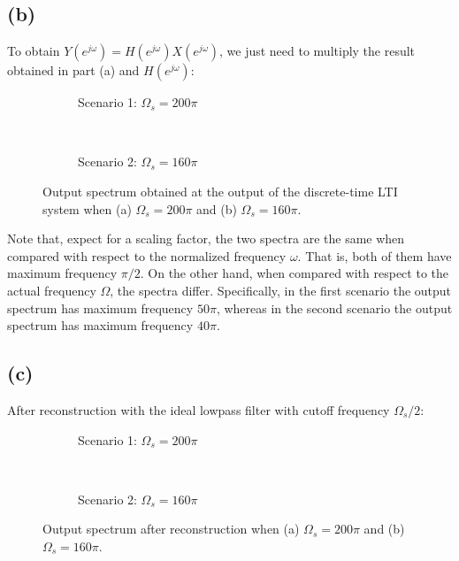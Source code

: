 \documentclass{article}
\begin{document}
\subsection{(b)}
To obtain $Y(e^{j\omega}) = H(e^{j\omega})X(e^{j\omega})$, we just need to multiply the result obtained in part (a) and $H(e^{j\omega})$:

\begin{figure}[h!]
	\centering
	\begin{subfigure}[h!]{0.5\textwidth}
		\resizebox{\textwidth}{!}{}
		\caption{Scenario 1: $\Omega_s = 200\pi$}
	\end{subfigure}%
	~ %
	\begin{subfigure}[h!]{0.5\textwidth}
		\resizebox{\textwidth}{!}{}
		\caption{Scenario 2: $\Omega_s = 160\pi$}
	\end{subfigure}
	\caption{Output spectrum obtained at the output of the discrete-time LTI system when (a) $\Omega_s = 200\pi$ and (b) $\Omega_s = 160\pi$.}
\end{figure}
	
Note that, expect for a scaling factor, the two spectra are the same when compared with respect to the normalized frequency $\omega$. That is, both of them have maximum frequency $\pi/2$. On the other hand, when compared with respect to the actual frequency $\Omega$, the spectra differ. Specifically, in the first scenario the output spectrum has maximum frequency $50\pi$, whereas in the second scenario the output spectrum has maximum frequency $40\pi$.
	
\subsection{(c)}
After reconstruction with the ideal lowpass filter with cutoff frequency $\Omega_s/2$:

\begin{figure}[h!]
	\centering
	\begin{subfigure}[h!]{0.5\textwidth}
		\resizebox{\textwidth}{!}{}
		\caption{Scenario 1: $\Omega_s = 200\pi$}
	\end{subfigure}%
	~ %
	\begin{subfigure}[h!]{0.5\textwidth}
		\resizebox{\textwidth}{!}{}
		\caption{Scenario 2: $\Omega_s = 160\pi$}
	\end{subfigure}
	\caption{Output spectrum after reconstruction when (a) $\Omega_s = 200\pi$ and (b) $\Omega_s = 160\pi$.}
\end{figure}
	
\end{document}
